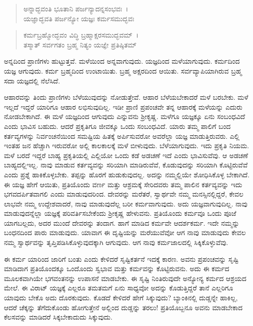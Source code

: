 \begin{verse}
ಅನ್ನಾದ್ಭವಂತಿ ಭೂತಾನಿ ಪರ್ಜನ್ಯಾದನ್ನಸಂಭವಃ~।\\ಯಜ್ಞಾದ್ಭವತಿ ಪರ್ಜನ್ಯೋ ಯಜ್ಞಃ ಕರ್ಮಸಮುದ್ಭವಃ 
\end{verse}

\begin{verse}
ಕರ್ಮಬ್ರಹ್ಮೋದ್ಭವಂ ವಿದ್ಧಿ ಬ್ರಹ್ಮಾಕ್ಷರಸಮುದ್ಭವಮ್~।\\ತಸ್ಮಾತ್ ಸರ್ವಗತಂ ಬ್ರಹ್ಮ ನಿತ್ಯಂ ಯಜ್ಞೇ ಪ್ರತಿಷ್ಠಿತಮ್ 
\end{verse}

{\small ಅನ್ನದಿಂದ ಪ್ರಾಣಿಗಳು ಹುಟ್ಟುತ್ತವೆ. ಮಳೆಯಿಂದ ಅನ್ನವಾಗುವುದು. ಯಜ್ಞದಿಂದ ಮಳೆಯಾಗುವುದು. ಕರ್ಮದಿಂದ ಯಜ್ಞ ಆಗುವುದು. ಕರ್ಮ ಬ್ರಹ್ಮದಿಂದ ಉಂಟಾಯಿತು. ಬ್ರಹ್ಮ ಅಕ್ಷರದಿಂದ ಆಯಿತು. ಸರ್ವವ್ಯಾಪಿಯಾಗಿರುವ ಬ್ರಹ್ಮ ಸದಾ ಯಜ್ಞದಲ್ಲಿ ನೆಲೆಸಿದೆ.}

ಆಹಾರವನ್ನು ತಿಂದು ಪ್ರಾಣಿಗಳು ಬೆಳೆಯುವುದನ್ನು ನೋಡುತ್ತೇವೆ. ಆಹಾರ ಬೆಳೆಯಬೇಕಾದರೆ ಮಳೆ ಬರಬೇಕು. ಮಳೆ ಇಲ್ಲದೆ ಇದ್ದರೆ ಯಾರಿಗೂ ಆಹಾರ ಲಭಿಸುವುದಿಲ್ಲ. ಇಡೀ ಪ್ರಾಣಿ ಪ್ರಪಂಚವೇ ತನ್ನ ಆಹಾರಕ್ಕೆ ಮಳೆಯನ್ನು ಎದುರು ನೋಡಬೇಕಾಗಿದೆ. ಈ ಮಳೆ ಯಜ್ಞದಿಂದ ಆಗುವುದು ಎನ್ನುವನು ಶ‍್ರೀಕೃಷ್ಣ. ಮಳೆಗೂ ಯಜ್ಞಕ್ಕೂ ಏನು ಸಂಬಂಧವಿದೆ ಎಂದು ಭಾವಿಸ ಬಹುದು. ಆದರೆ ಪ್ರಕೃತಿಗೂ ಜೀವಕ್ಕೂ ಒಂದು ಸಂಬಂಧವಿದೆ. ಯಾರು ತಮ್ಮ ಪಾಲಿಗೆ ಬಂದ ಕರ್ತವ್ಯಗಳನ್ನು ನಿರ್ವಂಚನೆಯಿಂದ ಸಮಷ್ಟಿಯ ಹಿತಕ್ಕೆ ಅರ್ಪಿಸುವರೋ ಅವರೆಲ್ಲಾ ಯಜ್ಞ ಮಾಡುತ್ತಿರುವರು. ಎಲ್ಲಿ ಇಂತಹ ಜನ ಹೆಚ್ಚಾಗಿ ಇರುವರೋ ಅಲ್ಲಿ ಕಾಲಕಾಲಕ್ಕೆ ಮಳೆ ಬೀಳುವುದು. ಬೆಳೆಯಾಗುವುದು. ಇದು ಪ್ರಕೃತಿ ನಿಯಮ. ಮಳೆ ಬರದೆ ಇದ್ದರೆ ಬಾಹ್ಯ ಪ್ರಕೃತಿಯಲ್ಲಿ ಎಲ್ಲಿಯೋ ಒಂದು ಕಡೆ ಅಡಚಣೆ ಇದೆ ಎಂದು ಭಾವಿಸುವೆವು. ಆ ಅಡಚಣೆ ಬಾಹ್ಯದಲ್ಲಿಇಲ್ಲ. ನಾವು ಮಾಡುವ ಕರ್ತವ್ಯವನ್ನು ಸರಿಯಾಗಿ ಮಾಡಿರುವೆವೆ, ಕೊಡುವುದನ್ನು ಸರಿಯಾಗಿ ಕೊಟ್ಟಿರುವೆವೆ ಎಂದು ಪ್ರಶ್ನೆ ಹಾಕಿಕೊಳ್ಳಬೇಕು. ತಪ್ಪನ್ನು ಹೊರಗೆ ಹುಡುಕುವುದಲ್ಲ. ಅದನ್ನು ನಮ್ಮಲ್ಲಿಯೇ ಶೋಧಿಸಿಕೊಳ್ಳ ಬೇಕಾಗಿದೆ. ಈ ಯಜ್ಞ ಹೇಗೆ ಆಯಿತು, ಪ್ರತಿಯೊಂದು ವರ್ಣ ಮತ್ತು ಆಶ್ರಮಕ್ಕೆ ಸೇರಿದವರು ತಮ್ಮ ಪಾಲಿನ ಕರ್ತವ್ಯವನ್ನು ಇದು ಭಗವದರ್ಪಿತವಾಗಲಿ ಎಂದು ಮಾಡುವುದರಿಂದ. ದೇವರನ್ನು ಮರೆತರೆ, ಸ್ವಾರ್ಥವೇ ನಮ್ಮ ಮನಸ್ಸಿನಲ್ಲಿದ್ದರೆ, ಕೇವಲ ಲಾಭವೇ ನಮ್ಮ ಉದ್ದೇಶವಾದರೆ, ನಾವು ಮಾಡುವುದೆಲ್ಲ ಬರೀ ಕರ್ಮವಾಗುವುದು. ಅದು ಯಜ್ಞವಾಗುವುದಿಲ್ಲ. ನಾವು ಮಾಡುವುದನ್ನೆಲ್ಲಾ ಯಜ್ಞಕ್ಕೆ ಪರಿವರ್ತಿಸಬೇಕೆಂದು ಶ‍್ರೀಕೃಷ್ಣ ಹೇಳುವನು. ಪ್ರತಿಯೊಂದು ಕರ್ಮವೂ ಒಂದು ಪೂಜೆ ಯಾಗಬಲ್ಲದು, ಅದರ ಮುಂದೆ ದೇವರನ್ನು ತಂದಾಗ. ಹಾಗೆ ಮಾಡಿದ ಕರ್ಮವೇ ಆದರ್ಶಕರ್ಮ. ಇದೇ ನಮ್ಮನ್ನು ಬಂಧನದಿಂದ ಪಾರು ಮಾಡುವುದು. ಯಾವಾಗ ಈ ದೃಷ್ಟಿಯನ್ನು ಮರೆಯುವೆವೋ ಆಗ ನಾವು ಮಾಡುವುದು ಕೇವಲ ನಮ್ಮ ಸ್ವಾರ್ಥವನ್ನು ತೃಪ್ತಿಪಡಿಸಿಕೊಳ್ಳುವುದಕ್ಕಾಗಿ ಆಗುವುದು. ಆಗ ನಾವು ಕರ್ಮಜಾಲದಲ್ಲಿ ಸಿಕ್ಕಿಕೊಳ್ಳುವೆವು.

ಈ ಕರ್ಮ ಯಾರಿಂದ ಜಾರಿಗೆ ಬಂತು ಎಂದು ಕೇಳಿದರೆ ಸೃಷ್ಟಿಕರ್ತನೆ ಇದಕ್ಕೆ ಕಾರಣ. ಅವನು ಪ್ರಪಂಚವನ್ನು ಸೃಷ್ಟಿ ಮಾಡಿದಾಗ ಪ್ರತಿಯೊಂದಕ್ಕೂ ಒಂದೊಂದು ಸ್ವಭಾವ ಮತ್ತು ಕರ್ಮವನ್ನು ಕೊಟ್ಟಿರುವನು. ಅದು ಈ ಕರ್ಮದ ಮೂಲಕವಾಗಿಯೇ ಭಗವಂತನನ್ನು ಉಪಾಸನೆ ಮಾಡಬೇಕು. ಈ ಸೃಷ್ಟಿ ನಿಂತಿರುವುದೇ ಅನ್ಯೋನ್ಯ ಕರ್ಮದ ಆಶ್ರಯದ ಮೇಲೆ. ಈ ವಿರಾಟ್ ಯಜ್ಞಕ್ಕೆ ಎಲ್ಲರೂ ತಮತಮಗೆ ಏನು ಸಾಧ್ಯವೋ ಅದನ್ನು ಕೊಡುತ್ತಿದ್ದರೆ ತಾನೆ ಎಲ್ಲರಿಗೂ ಯಾವುದು ಬೇಕೊ ಅದು ದೊರಕುವುದು. ಕೊಡದೆ ಕೇಳಿದರೆ ಹೇಗೆ ಸಿಕ್ಕುವುದು? ಬ್ಯಾಂಕಿನಲ್ಲಿ ದುಡ್ಡನ್ನೇ ಹಾಕಿಲ್ಲ, ಆದರೆ ಚೆಕ್ಕನ್ನು ತೆಗೆದುಕೊಂಡು ಹೋಗುತ್ತೇನೆ ಅಲ್ಲಿಂದ ದುಡ್ಡನ್ನು ತರಲು! ಪ್ರತಿಯೊಬ್ಬನೂ ಅವನು ಮಾಡಬೇಕಾದ ಕೆಲಸವನ್ನು ಮಾಡಿದರೆ ಸಿಕ್ಕಬೇಕಾದುದು ಸಿಕ್ಕುವುದು.

